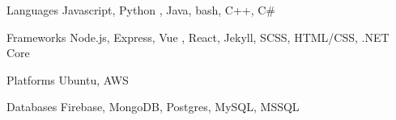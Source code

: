 

\begin{cvskills}

  \cvskill
    {Languages} %
    {Javascript, Python} %
    {, Java, bash, C++, C\#} %

  \cvskill
    {Frameworks} %
    {Node.js, Express, Vue} %
    {, React, Jekyll, SCSS, HTML/CSS, .NET Core} %

  \cvskill
    {Platforms} %
    {} %
    {Ubuntu, AWS} %

  \cvskill
    {Databases} %
    {} %
    {Firebase, MongoDB, Postgres, MySQL, MSSQL} %

\end{cvskills}
